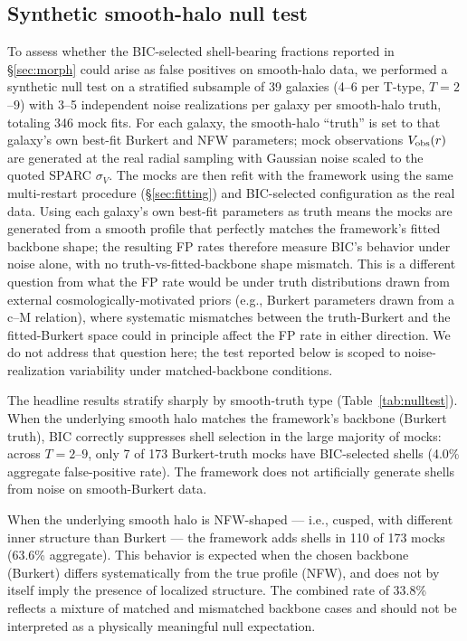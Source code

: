 \documentclass[linenumbers]{aastex701}
\newcommand{\Vobs}{V_{\rm obs}}
\begin{document}
\subsection{Synthetic smooth-halo null test}\label{sec:nulltest}

To assess whether the BIC-selected shell-bearing fractions reported in \S\ref{sec:morph} could arise as false positives on smooth-halo data, we performed a synthetic null test on a stratified subsample of 39 galaxies (4--6 per T-type, $T=2$--$9$) with 3--5 independent noise realizations per galaxy per smooth-halo truth, totaling 346 mock fits. For each galaxy, the smooth-halo ``truth'' is set to that galaxy's own best-fit Burkert and NFW parameters; mock observations $\Vobs(r)$ are generated at the real radial sampling with Gaussian noise scaled to the quoted SPARC $\sigma_V$. The mocks are then refit with the framework using the same multi-restart procedure (\S\ref{sec:fitting}) and BIC-selected configuration as the real data. Using each galaxy's own best-fit parameters as truth means the mocks are generated from a smooth profile that perfectly matches the framework's fitted backbone shape; the resulting FP rates therefore measure BIC's behavior under noise alone, with no truth-vs-fitted-backbone shape mismatch. This is a different question from what the FP rate would be under truth distributions drawn from external cosmologically-motivated priors (e.g., Burkert parameters drawn from a c--M relation), where systematic mismatches between the truth-Burkert and the fitted-Burkert space could in principle affect the FP rate in either direction. We do not address that question here; the test reported below is scoped to noise-realization variability under matched-backbone conditions.

The headline results stratify sharply by smooth-truth type (Table~\ref{tab:nulltest}). When the underlying smooth halo matches the framework's backbone (Burkert truth), BIC correctly suppresses shell selection in the large majority of mocks: across $T=2$--$9$, only 7 of 173 Burkert-truth mocks have BIC-selected shells (4.0\% aggregate false-positive rate). The framework does not artificially generate shells from noise on smooth-Burkert data.

When the underlying smooth halo is NFW-shaped --- i.e., cusped, with different inner structure than Burkert --- the framework adds shells in 110 of 173 mocks (63.6\% aggregate). This behavior is expected when the chosen backbone (Burkert) differs systematically from the true profile (NFW), and does not by itself imply the presence of localized structure. The combined rate of 33.8\% reflects a mixture of matched and mismatched backbone cases and should not be interpreted as a physically meaningful null expectation.
\end{document}
